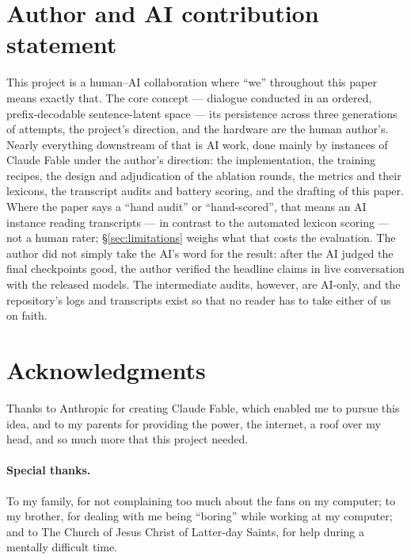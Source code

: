 \documentclass[11pt]{article}
\begin{document}
\section*{Author and AI contribution statement}
\label{sec:contrib}
This project is a human--AI collaboration where ``we'' throughout this paper
means exactly that. The core concept --- dialogue conducted in an ordered,
prefix-decodable sentence-latent space --- its persistence across three
generations of attempts, the project's direction, and the hardware are the
human author's. Nearly everything downstream of that is AI work, done mainly
by instances of Claude Fable under the author's direction: the
implementation, the training recipes, the design and adjudication of the
ablation rounds, the metrics and their lexicons, the transcript audits and
battery scoring, and the drafting of this paper. Where the paper says a
``hand audit'' or ``hand-scored'', that means an AI instance reading
transcripts --- in contrast to the automated lexicon scoring --- not a human
rater; \S\ref{sec:limitations} weighs what that costs the evaluation. The
author did not simply take the AI's word for the result: after the AI judged
the final checkpoints good, the author verified the headline claims in live
conversation with the released models. The intermediate audits, however, are
AI-only, and the repository's logs and transcripts exist so that no reader
has to take either of us on faith.

\section*{Acknowledgments}
Thanks to Anthropic for creating Claude Fable, which enabled me to pursue
this idea, and to my parents for providing the power, the internet, a roof
over my head, and so much more that this project needed.

\paragraph{Special thanks.} To my family, for not complaining too much about
the fans on my computer; to my brother, for dealing with me being ``boring''
while working at my computer; and to The Church of Jesus Christ of
Latter-day Saints, for help during a mentally difficult time.





\appendix
\end{document}
